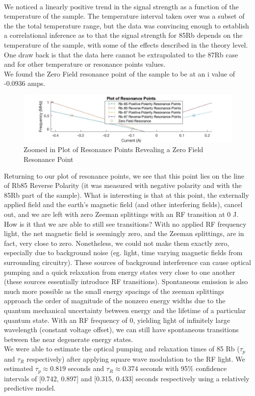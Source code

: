 \documentclass{article}
\begin{document}
    \\\indent We noticed a linearly positive trend in the signal strength as a function of the temperature of the sample. The temperature interval taken over was a subset of the the total temperature range, but the data was convincing enough to establish a correlational inference as to that the signal strength for 85Rb depends on the temperature of the sample, with some of the effects described in the theory level. One draw back is that the data here cannot be extrapolated to the 87Rb case and for other temperature or resonance points values.
    \\\indent We found the Zero Field resonance point of the sample to be at an i value of -0.0936 amps. 
    \begin{figure}[H] %
        \centering
        \includegraphics[scale = 0.25]{7.jpg}
        \caption{Zoomed in Plot of Resonance Points Revealing a Zero Field Resonance Point}
        \label{fig:my_label}
    \end{figure}
    Returning to our plot of resonance points, we see that this point lies on the line of Rb85 Reverse Polarity (it was measured with negative polarity and with the 85Rb part of the sample). What is interesting is that at this point, the externally applied field and the earth's magnetic field (and other interfering fields), cancel out, and we are left with zero Zeeman splittings with an RF transition at 0 J. How is it that we are able to still see transitions? With no applied RF frequency light, the net magnetic field is seemingly zero, and the Zeeman splittings, are in fact, very close to zero. Nonetheless, we could not make them exactly zero, especially due to background noise (eg. light, time varying magnetic fields from surrounding circuitry). These sources of background interference can cause optical pumping and a quick relaxation from energy states very close to one another (these sources essentially introduce RF transitions). Spontaneous emission is also much more possible as the small energy spacings of the zeeman splittings approach the order of magnitude of the nonzero energy widths due to the quantum mechanical uncertainty between energy and the lifetime of a particular quantum state. With an RF frequency of 0, yielding light of infinitely large wavelength (constant voltage offset), we can still have spontaneous transitions between the near degenerate energy states.
    \\\indent We were able to estimate the optical pumping and relaxation times of 85 Rb ($\tau_p$ and $\tau_R$ respectively) after applying square wave modulation to the RF light. We estimated $\tau_p \approx 0.819$ seconds and $\tau_R \approx 0.374$ seconds with 95$\%$ confidence intervals of [0.742, 0.897] and [0.315, 0.433] seconds respectively using a relatively predictive model.
    
\end{document}
